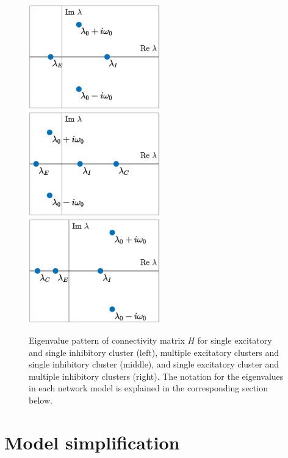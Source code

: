 \documentclass[reqno]{siamonline190516}
\begin{document}
\begin{figure}
    \centering
    \includegraphics[width=5.7cm]{images/eigpattern1.eps} \hspace{-0.7cm}
    \includegraphics[width=5.7cm]{images/eigpattern2.eps} \hspace{-0.7cm}
    \includegraphics[width=5.7cm]{images/eigpattern3.eps} 
    \caption{Eigenvalue pattern of connectivity matrix $H$ for single excitatory and single inhibitory cluster (left), multiple excitatory clusters and single inhibitory cluster (middle), and single excitatory cluster and multiple inhibitory clusters (right). The notation for the eigenvalues in each network model is explained in the corresponding section below.}
    \label{fig:Heigpattern}
\end{figure}

\section{Model simplification}\label{sec:simplermodel}
\end{document}
